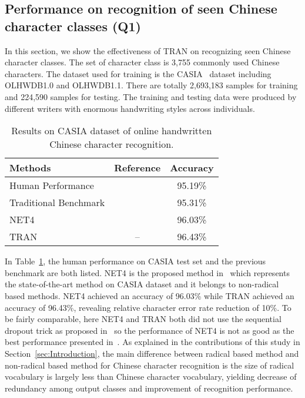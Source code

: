\documentclass[a4paper,conference]{IEEEtran}
\begin{document}
\subsection{Performance on recognition of seen Chinese character classes (Q1)}
\label{sec:Performance on recognition of seen Chinese character classes (Q1)}
In this section, we show the effectiveness of TRAN on recognizing seen Chinese character classes. The set of character class is 3,755 commonly used Chinese characters. The dataset used for training is the CASIA~\cite{liu2011casia} dataset including OLHWDB1.0 and OLHWDB1.1. There are totally 2,693,183 samples for training and 224,590 samples for testing. The training and testing data were produced by different writers with enormous handwriting styles across individuals.
\begin{table}[h]
\caption{\label{tab:1}{Results on CASIA dataset of online handwritten Chinese character recognition.}}
\centering
\begin{tabular}{l c c}
\toprule
\textbf{Methods} & \textbf{Reference} & \textbf{Accuracy}\\
\midrule
Human Performance & \cite{yin2013icdar} & 95.19\%\\
Traditional Benchmark & \cite{liu2013online} & 95.31\%\\
NET4 & \cite{zhang2017drawing} & 96.03\%\\
TRAN & -- & 96.43\%\\
\bottomrule
\end{tabular}
\end{table}
In Table~\ref{tab:1}, the human performance on CASIA test set and the previous benchmark are both listed. NET4 is the proposed method in~\cite{zhang2017drawing} which represents the state-of-the-art method on CASIA dataset and it belongs to non-radical based methods. NET4 achieved an accuracy of 96.03\% while TRAN achieved an accuracy of 96.43\%, revealing relative character error rate reduction of 10\%. To be fairly comparable, here NET4 and TRAN both did not use the sequential dropout trick as proposed in~\cite{zhang2017drawing} so the performance of NET4 is not as good as the best performance presented in~\cite{zhang2017drawing}. As explained in the contributions of this study in Section~\ref{sec:Introduction}, the main difference between radical based method and non-radical based method for Chinese character recognition is the size of radical vocabulary is largely less than Chinese character vocabulary, yielding decrease of redundancy among output classes and improvement of recognition performance.
\end{document}

